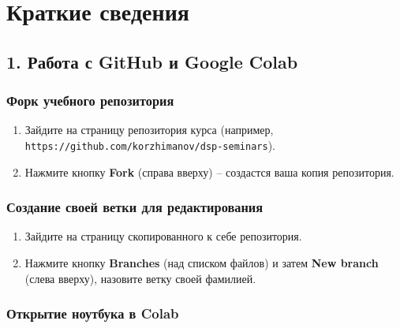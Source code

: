 \documentclass[12pt,a4paper,openany]{book}
\providecommand{\tightlist}{\setlength{\itemsep}{0pt}\setlength{\parskip}{0pt}}
\begin{document}
\section*{Краткие сведения}

\subsection*{1. Работа с GitHub и Google Colab}

\subsubsection*{Форк учебного репозитория}

\begin{enumerate}
\def\labelenumi{\arabic{enumi}.}
\tightlist
\item
  Зайдите на страницу репозитория курса (например, \texttt{https:\allowbreak{}/\allowbreak{}/\allowbreak{}github.\allowbreak{}com/\allowbreak{}korzhimanov/\allowbreak{}dsp-seminars}).
\item
  Нажмите кнопку \textbf{Fork} (справа вверху) -- создастся ваша копия репозитория.
\end{enumerate}

\subsubsection*{Создание своей ветки для редактирования}

\begin{enumerate}
\def\labelenumi{\arabic{enumi}.}
\tightlist
\item
  Зайдите на страницу скопированного к себе репозитория.
\item
  Нажмите кнопку \textbf{Branches} (над списком файлов) и затем \textbf{New branch} (слева вверху), назовите ветку своей фамилией.
\end{enumerate}

\subsubsection*{Открытие ноутбука в Colab}
\end{document}

